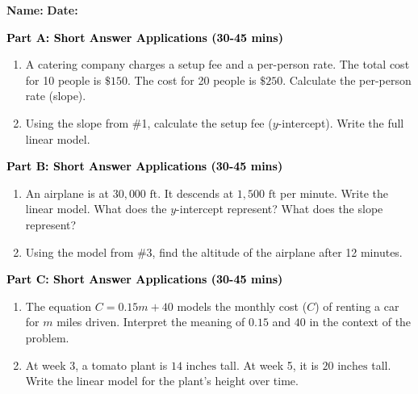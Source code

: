 \documentclass[12pt, letterpaper, fleqn]{article}
\begin{document}
\textbf{Name:} \underline{\hspace{5cm}}
\hfill
\textbf{Date:} \underline{\hspace{3cm}}\\


\begin{tcolorbox}[colback=customteal!20]
\large\textcolor{black}{\textbf{Part A: Short Answer Applications (30-45 mins)}}
\end{tcolorbox}

\vspace{3mm}

\begin{enumerate}[itemsep=4.2cm, leftmargin=0.6cm]
\item A catering company charges a setup fee and a per-person rate. The total cost for 10 people is $\$150$. The cost for 20 people is $\$250$. Calculate the per-person rate (slope).
\item Using the slope from \#1, calculate the setup fee ($y$-intercept). Write the full linear model.
\end{enumerate}

\newpage

\begin{tcolorbox}[colback=customteal!20]
\large\textcolor{black}{\textbf{Part B: Short Answer Applications (30-45 mins)}}
\end{tcolorbox}

\vspace{3mm}

\begin{enumerate}[itemsep=4.2cm, leftmargin=0.6cm, resume]
\item An airplane is at $30,000\text{ ft}$. It descends at $1,500\text{ ft}$ per minute. Write the linear model. What does the $y$-intercept represent? What does the slope represent?
\item Using the model from \#3, find the altitude of the airplane after 12 minutes.
\end{enumerate}

\newpage

\begin{tcolorbox}[colback=customteal!20]
\large\textcolor{black}{\textbf{Part C: Short Answer Applications (30-45 mins)}}
\end{tcolorbox}

\vspace{3mm}

\begin{enumerate}[itemsep=4.2cm, leftmargin=0.6cm, resume]
\item The equation $C = 0.15m + 40$ models the monthly cost ($C$) of renting a car for $m$ miles driven. Interpret the meaning of $0.15$ and $40$ in the context of the problem.
\item At week 3, a tomato plant is $14\text{ inches}$ tall. At week 5, it is $20\text{ inches}$ tall. Write the linear model for the plant's height over time.
\end{enumerate}
\end{document}
